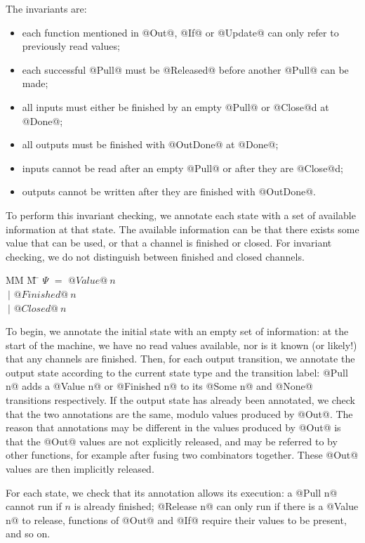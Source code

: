 The invariants are:
\begin{itemize}
\item each function mentioned in @Out@, @If@ or @Update@ can only refer to previously read values;
\item each successful @Pull@ must be @Released@ before another @Pull@ can be made;
\item all inputs must either be finished by an empty @Pull@ or @Close@d at @Done@;
\item all outputs must be finished with @OutDone@ at @Done@;
\item inputs cannot be read after an empty @Pull@ or after they are @Close@d;
\item outputs cannot be written after they are finished with @OutDone@.
\end{itemize}

To perform this invariant checking, we annotate each state with a set of available information at that state.
The available information can be that there exists some value that can be used, or that a channel is finished or closed.
For invariant checking, we do not distinguish between finished and closed channels.

\begin{tabbing}
MM \= M \= \kill
$\Psi$ \> $=$  \> $@Value@~n$ \\
       \> $~|$ \> $@Finished@~n$ \\
       \> $~|$ \> $@Closed@~n$ \\
\end{tabbing}

To begin, we annotate the initial state with an empty set of information: at the start of the machine, we have no read values available, nor is it known (or likely!) that any channels are finished.
Then, for each output transition, we annotate the output state according to the current state type and the transition label: @Pull n@ adds a @Value n@ or @Finished n@ to its @Some n@ and @None@ transitions respectively.
If the output state has already been annotated, we check that the two annotations are the same, modulo values produced by @Out@.
The reason that annotations may be different in the values produced by @Out@ is that the @Out@ values are not explicitly released, and may be referred to by other functions, for example after fusing two combinators together.
These @Out@ values are then implicitly released.

For each state, we check that its annotation allows its execution: a @Pull n@ cannot run if $n$ is already finished; @Release n@ can only run if there is a @Value n@ to release, functions of @Out@ and @If@ require their values to be present, and so on.


